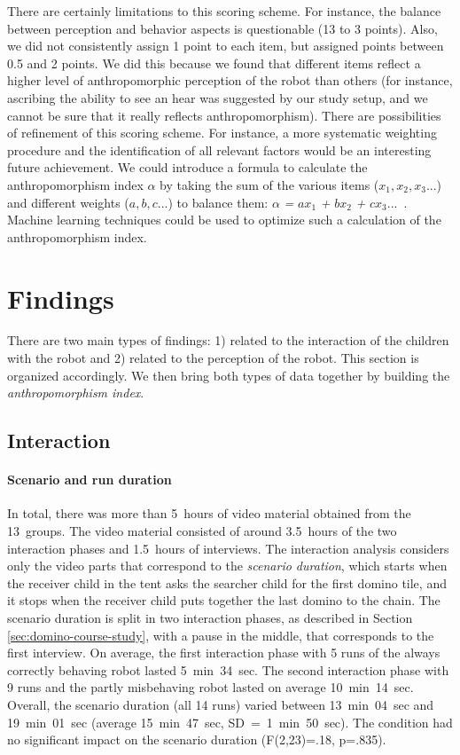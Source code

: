 \documentclass{sig-alternate}
\begin{document}
There are certainly limitations to this scoring scheme. For instance, the
balance between perception and behavior aspects is questionable (13 to 3
points). Also, we did not consistently assign 1 point to each item, but assigned
points between 0.5 and 2 points. We did this because we found that different
items reflect a higher level of anthropomorphic perception of the robot than
others (for instance, ascribing the ability to see an hear was suggested by our
study setup, and we cannot be sure that it really reflects anthropomorphism).
There are possibilities of refinement of this scoring scheme. For instance, a
more systematic weighting procedure and the identification of all relevant
factors would be an interesting future achievement. We could introduce a formula
to calculate the anthropomorphism index \textit{$\alpha$} by taking the sum of
the various items ($x_1, x_2, x_3...$) and different weights ($a, b, c ...$) to
balance them: $\alpha$ \textit{=} $a x_1$ \textit{+} $b x_2$ \textit{+} $c x_3
...$~. Machine learning techniques could be used to optimize such a calculation
of the anthropomorphism index.


\section{Findings}

There are two main types of findings: 1) related to the interaction of the
children with the robot and 2) related to the perception of the robot. This
section is organized accordingly. We then bring both types of data together by
building the \textit{anthropomorphism index}. 

\subsection{Interaction}

\paragraph{Scenario and run duration}

In total, there was more than 5~hours of video material obtained from the
13~groups. The video material consisted of around 3.5~hours of the two
interaction phases and 1.5~hours of interviews. The interaction analysis
considers only the video parts that correspond to the \textit{scenario
duration}, which starts when the receiver child in the tent asks the searcher
child for the first domino tile, and it stops when the receiver child puts
together the last domino to the chain. The scenario duration is split in two
interaction phases, as described in Section \ref{sec:domino-course-study}, with
a pause in the middle, that corresponds to the first interview. On average, the
first interaction phase with 5 runs of the always correctly behaving robot
lasted 5~min~34~sec. The second interaction phase with 9 runs and the partly
misbehaving robot lasted on average 10~min~14~sec. Overall, the scenario
duration (all 14 runs) varied between 13~min~04~sec and 19~min~01~sec (average
15~min~47~sec, SD~=~1~min~50~sec). The condition had no significant impact on
the scenario duration (F(2,23)=.18, p=.835).\\
\end{document}
